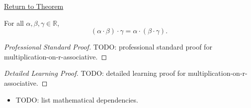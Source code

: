 \newpage
{}
\label{prf:multiplication-on-r-associative}

\begin{remark*}[Return]
\hyperref[thm:multiplication-on-r-associative]{Return to Theorem}
\end{remark*}

\begin{theorem*}
For all $\alpha,\beta,\gamma\in\mathbb{R}$,
\[
(\alpha\cdot\beta)\cdot\gamma=\alpha\cdot(\beta\cdot\gamma).
\]
\end{theorem*}

\begin{proof}[Professional Standard Proof]
\LRAProofBodyStart
TODO: professional standard proof for multiplication-on-r-associative.
\end{proof}

\begin{proof}[Detailed Learning Proof]
\LRAProofBodyStart
TODO: detailed learning proof for multiplication-on-r-associative.
\end{proof}

\begin{remark*}
\end{remark*}

\begin{dependencies}
\begin{itemize}
  \item TODO: list mathematical dependencies.
\end{itemize}
\end{dependencies}

\clearpage
